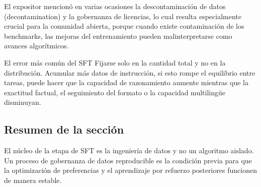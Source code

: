 El expositor mencionó en varias ocasiones la descontaminación de datos (decontamination) y la gobernanza de licencias, lo cual resulta especialmente crucial para la comunidad abierta, porque cuando existe contaminación de los benchmarks, las mejoras del entrenamiento pueden malinterpretarse como avances algorítmicos.

\begin{warningbox}{El error más común del SFT}
Fijarse solo en la cantidad total y no en la distribución. Acumular más datos de instrucción, si esto rompe el equilibrio entre tareas, puede hacer que la capacidad de razonamiento aumente mientras que la exactitud factual, el seguimiento del formato o la capacidad multilingüe disminuyan.
\end{warningbox}

\subsection{Resumen de la sección}
El núcleo de la etapa de SFT es la ingeniería de datos y no un algoritmo aislado. Un proceso de gobernanza de datos reproducible es la condición previa para que la optimización de preferencias y el aprendizaje por refuerzo posteriores funcionen de manera estable.


